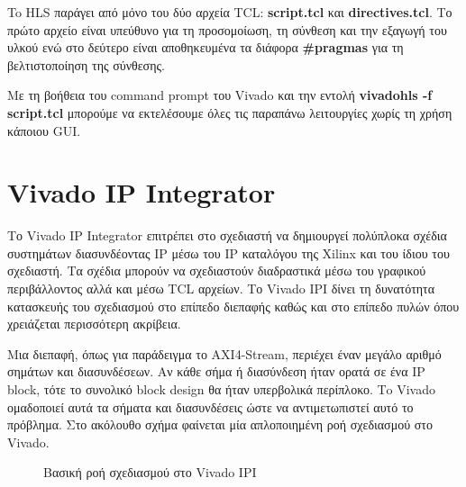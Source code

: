 To HLS παράγει από μόνο του δύο αρχεία TCL: \textbf{script.tcl} και \textbf{directives.tcl}. Το πρώτο αρχείο είναι υπεύθυνο για τη προσομοίωση, τη σύνθεση και την εξαγωγή του υλκού ενώ στο δεύτερο είναι αποθηκευμένα τα διάφορα \textbf{\#pragmas} για τη βελτιστοποίηση της σύνθεσης.

Με τη βοήθεια του command prompt του Vivado και την εντολή \textbf{vivado\textunderscore hls -f script.tcl} μπορούμε να εκτελέσουμε όλες τις παραπάνω λειτουργίες χωρίς τη χρήση κάποιου GUI.
\section{Vivado IP Integrator} \label{Vivado}

Το Vivado IP Integrator επιτρέπει στο σχεδιαστή να δημιουργεί πολύπλοκα σχέδια συστημάτων διασυνδέοντας IP μέσω του IP καταλόγου της Xilinx και του ίδιου του σχεδιαστή. Τα σχέδια μπορούν να σχεδιαστούν διαδραστικά μέσω του γραφικού περιβάλλοντος αλλά και μέσω TCL αρχείων. Το Vivado IPI δίνει τη δυνατότητα κατασκευής του σχεδιασμού στο επίπεδο διεπαφής καθώς και στο επίπεδο πυλών όπου χρειάζεται περισσότερη ακρίβεια.

Μια διεπαφή, όπως για παράδειγμα το AXI4-Stream, περιέχει έναν μεγάλο αριθμό σημάτων και διασυνδέσεων. Αν κάθε σήμα ή διασύνδεση ήταν ορατά σε ένα IP block, τότε το συνολικό block design θα ήταν υπερβολικά περίπλοκο. Τo Vivado ομαδοποιεί αυτά τα σήματα και διασυνδέσεις ώστε να αντιμετωπιστεί αυτό το πρόβλημα. Στο ακόλουθο σχήμα φαίνεται μία απλοποιημένη ροή σχεδιασμού στο Vivado.
\begin{figure}[H]
\begin{center}
\end{center}
\caption{Βασική ροή σχεδιασμού στο Vivado IPI}
\end{figure}
